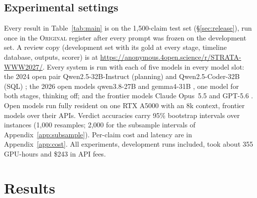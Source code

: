 \subsection{Experimental settings}
\label{sec:setup}

Every result in Table~\ref{tab:main} is on the 1{,}500-claim test set (\S\ref{sec:release}), run
once in the \textsc{Original} register after every prompt was frozen on the
development set. A review copy (development set with its gold at every
stage, timeline database, \art{} outputs, scorer) is at
\url{https://anonymous.4open.science/r/STRATA-WWW2027/}. Every system is run with each of five models in every
model slot: the 2024 open pair Qwen2.5-32B-Instruct (planning) and
Qwen2.5-Coder-32B (SQL) \cite{qwen2025qwen25}; the 2026 open models
qwen3.8-27B \cite{qwen2026qwen38} and gemma4-31B \cite{gemma2026gemma4}, one
model for both stages, thinking off; and the frontier models Claude Opus~5.5
\cite{anthropic2026opus55} and GPT-5.6 \cite{openai2026gpt56}. Open models run fully resident on one RTX A5000 with an 8k
context, frontier models over their APIs. Verdict
accuracies carry 95\% bootstrap intervals \cite{efron1993bootstrap} over instances (1{,}000 resamples; 2{,}000 for the subsample intervals
of Appendix~\ref{app:subsample}). Per-claim cost
and latency are in Appendix~\ref{app:cost}. All experiments, development
runs included, took about 355 GPU-hours and \$243 in API fees.

\section{Results}
\label{sec:results}

